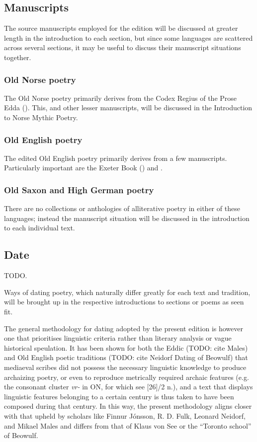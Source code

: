   \subsection{Manuscripts}

    The source manuscripts employed for the edition will be discussed at greater length in the introduction to each section, but since some languages are scattered across several sections, it may be useful to discuss their manuscript situations together.

    \subsubsection{Old Norse poetry}

    The Old Norse poetry primarily derives from the Codex Regius of the Prose Edda (\Regius).  This, and other lesser manuscripts, will be discussed in the Introduction to Norse Mythic Poetry.

    \subsubsection{Old English poetry}

    The edited Old English poetry primarily derives from a few manuscripts.  Particularly important are the Exeter Book (\ExeterBook) and \Lacnunga.

    \subsubsection{Old Saxon and High German poetry}

    There are no collections or anthologies of alliterative poetry in either of these languages; instead the manuscript situation will be discussed in the introduction to each individual text.

  \subsection{Date}

  TODO.

  Ways of dating poetry, which naturally differ greatly for each text and tradition, will be brought up in the respective introductions to sections or poems as seen fit.

  The general methodology for dating adopted by the present edition is however one that prioritises linguistic criteria rather than literary analysis or vague historical speulation.  It has been shown for both the Eddic (TODO: cite Males) and Old English poetic traditions (TODO: cite Neidorf Dating of Beowulf) that mediaeval scribes did not possess the necessary linguistic knowledge to produce archaizing poetry, or even to reproduce metrically required archaic features (e.g. the consonant cluster \emph{vr-} in ON, for which see [26]/2 n.), and a text that displays linguistic features belonging to a certain century is thus taken to have been composed during that century.  In this way, the present methodology aligns closer with that upheld by scholars like Finnur Jónsson, R. D. Fulk, Leonard Neidorf, and Mikael Males and differs from that of Klaus von See or the “Toronto school” of Beowulf.

